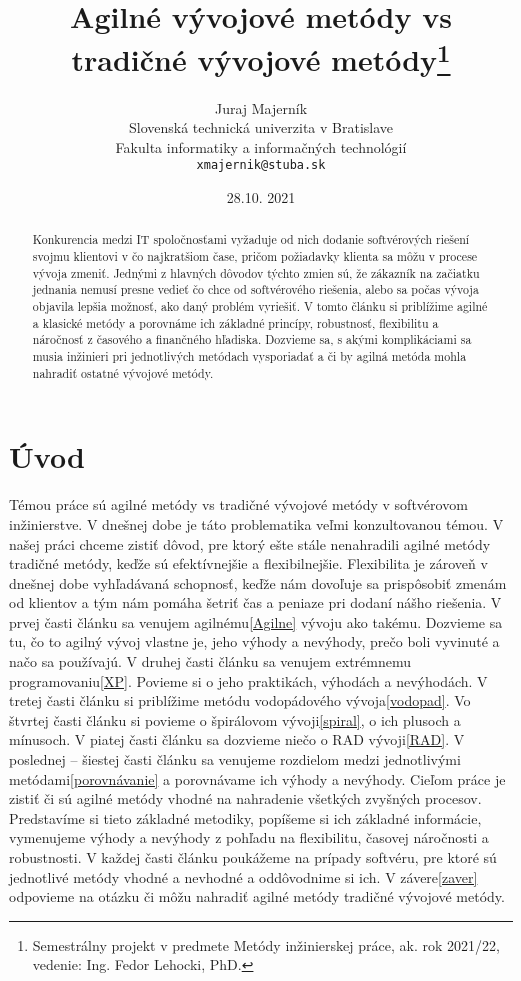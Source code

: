 \documentclass[10pt,oneside,slovak,a4paper]{article}
\title{Agilné vývojové metódy vs tradičné vývojové metódy\thanks{Semestrálny projekt v predmete Metódy inžinierskej práce, ak. rok 2021/22, vedenie: Ing. Fedor Lehocki, PhD.}}
\author{Juraj Majerník\\[2pt]
	{\small Slovenská technická univerzita v Bratislave}\\
	{\small Fakulta informatiky a informačných technológií}\\
	{\small \texttt{xmajernik@stuba.sk}}
	}
\date{\small 28.10. 2021}
\begin{document}
\maketitle
\begin{abstract}
\centering
Konkurencia medzi IT spoločnosťami vyžaduje od nich dodanie softvérových riešení svojmu 
klientovi v čo najkratšiom čase, pričom požiadavky klienta sa môžu v procese vývoja zmeniť. 
Jednými z hlavných dôvodov týchto zmien sú, že zákazník na začiatku jednania nemusí 
presne vedieť čo chce od softvérového riešenia, alebo sa počas vývoja objavila lepšia 
možnosť, ako daný problém vyriešiť. V tomto článku si priblížime agilné a klasické metódy a 
porovnáme ich základné princípy, robustnosť, flexibilitu a náročnosť z časového 
a finančného hľadiska. Dozvieme sa, s akými komplikáciami sa musia inžinieri pri jednotlivých 
metódach vysporiadať a či by agilná metóda mohla nahradiť ostatné vývojové metódy.
\end{abstract}

\section{Úvod}
Témou práce sú agilné metódy vs tradičné vývojové metódy v softvérovom inžinierstve. V dnešnej dobe je táto problematika veľmi konzultovanou témou. 
V našej práci chceme zistiť dôvod, pre ktorý ešte stále nenahradili agilné metódy tradičné metódy, keďže sú efektívnejšie a flexibilnejšie. Flexibilita je zároveň v dnešnej dobe vyhľadávaná schopnosť, keďže nám dovoľuje sa prispôsobiť zmenám od klientov a tým nám pomáha šetriť čas a peniaze pri dodaní nášho riešenia. 
V prvej časti článku sa venujem agilnému\ref{Agilne} vývoju ako takému. Dozvieme sa tu, čo to agilný vývoj vlastne je, jeho výhody a nevýhody, prečo boli vyvinuté a načo sa používajú. 
V druhej časti článku sa venujem extrémnemu programovaniu\ref{XP}. Povieme si o jeho praktikách, výhodách a nevýhodách. 
V tretej časti článku si priblížime metódu vodopádového vývoja\ref{vodopad}. 
Vo štvrtej časti článku si povieme o špirálovom vývoji\ref{spiral}, o ich plusoch a mínusoch. 
V piatej časti článku sa dozvieme niečo o RAD vývoji\ref{RAD}. 
V poslednej – šiestej časti článku sa venujeme rozdielom medzi jednotlivými metódami\ref{porovnávanie} a porovnávame ich výhody a nevýhody. 
Cieľom práce je zistiť či sú agilné metódy vhodné na nahradenie všetkých zvyšných procesov. Predstavíme si tieto základné metodiky, popíšeme si ich základné informácie, vymenujeme výhody a nevýhody z pohľadu na flexibilitu, časovej náročnosti a robustnosti. V každej časti článku poukážeme na prípady softvéru, pre ktoré sú jednotlivé metódy vhodné a nevhodné a oddôvodnime si ich. V závere\ref{zaver} odpovieme na otázku či môžu nahradiť agilné metódy tradičné vývojové metódy. 
\end{document}

